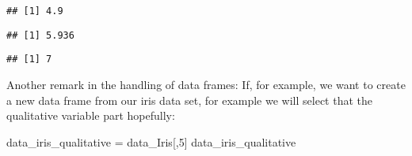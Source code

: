 \documentclass[
]{article}
\newenvironment{Shaded}{\begin{snugshade}}{\end{snugshade}}
\newcommand{\DecValTok}[1]{\textcolor[rgb]{0.00,0.00,0.81}{#1}}
\newcommand{\FunctionTok}[1]{\textcolor[rgb]{0.13,0.29,0.53}{\textbf{#1}}}
\newcommand{\NormalTok}[1]{#1}
\newcommand{\OtherTok}[1]{\textcolor[rgb]{0.56,0.35,0.01}{#1}}
\newcommand{\SpecialCharTok}[1]{\textcolor[rgb]{0.81,0.36,0.00}{\textbf{#1}}}
\newcommand{\StringTok}[1]{\textcolor[rgb]{0.31,0.60,0.02}{#1}}
\begin{document}
\begin{verbatim}
## [1] 4.9
\end{verbatim}

\begin{Shaded}
\end{Shaded}

\begin{verbatim}
## [1] 5.936
\end{verbatim}

\begin{Shaded}
\end{Shaded}

\begin{verbatim}
## [1] 7
\end{verbatim}

Another remark in the handling of data frames: If, for example, we want
to create a new data frame from our iris data set, for example we will
select that the qualitative variable part hopefully:

\begin{Shaded}
\begin{Highlighting}[]
\NormalTok{data\_iris\_qualitative }\OtherTok{=}\NormalTok{ data\_Iris[,}\DecValTok{5}\NormalTok{]}
\NormalTok{data\_iris\_qualitative}
\end{Highlighting}
\end{Shaded}
\end{document}
